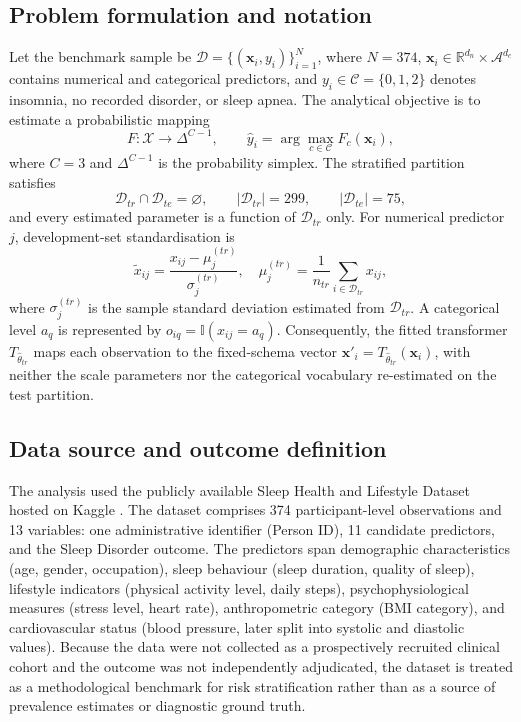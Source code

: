 \documentclass{elektr}
\begin{document}
\subsection{Problem formulation and notation}
Let the benchmark sample be $\mathcal{D}=\{(\mathbf{x}_i,y_i)\}_{i=1}^{N}$, where $N=374$, $\mathbf{x}_i\in\mathbb{R}^{d_n}\times\mathcal{A}^{d_c}$ contains numerical and categorical predictors, and $y_i\in\mathcal{C}=\{0,1,2\}$ denotes insomnia, no recorded disorder, or sleep apnea. The analytical objective is to estimate a probabilistic mapping
\begin{equation}
F:\mathcal{X}\rightarrow\Delta^{C-1},\qquad
\hat y_i=\arg\max_{c\in\mathcal{C}}F_c(\mathbf{x}_i),
\label{eq:problem}
\end{equation}
where $C=3$ and $\Delta^{C-1}$ is the probability simplex. The stratified partition satisfies
\begin{equation}
\mathcal{D}_{tr}\cap\mathcal{D}_{te}=\varnothing,
\qquad |\mathcal{D}_{tr}|=299,
\qquad |\mathcal{D}_{te}|=75,
\label{eq:partition}
\end{equation}
and every estimated parameter is a function of $\mathcal{D}_{tr}$ only. For numerical predictor $j$, development-set standardisation is
\begin{equation}
\widetilde{x}_{ij}=\frac{x_{ij}-\mu^{(tr)}_j}{\sigma^{(tr)}_j},
\quad
\mu^{(tr)}_j=\frac{1}{n_{tr}}\sum_{i\in\mathcal{D}_{tr}}x_{ij},
\label{eq:standardise}
\end{equation}
where $\sigma^{(tr)}_j$ is the sample standard deviation estimated from $\mathcal{D}_{tr}$. A categorical level $a_q$ is represented by $o_{iq}=\mathbb{I}(x_{ij}=a_q)$. Consequently, the fitted transformer $T_{\widehat{\theta}_{tr}}$ maps each observation to the fixed-schema vector $\mathbf{x}'_i=T_{\widehat{\theta}_{tr}}(\mathbf{x}_i)$, with neither the scale parameters nor the categorical vocabulary re-estimated on the test partition.

\subsection{Data source and outcome definition}
The analysis used the publicly available Sleep Health and Lifestyle Dataset hosted on Kaggle \cite{kaggle2023}. The dataset comprises 374 participant-level observations and 13 variables: one administrative identifier (Person ID), 11 candidate predictors, and the Sleep Disorder outcome. The predictors span demographic characteristics (age, gender, occupation), sleep behaviour (sleep duration, quality of sleep), lifestyle indicators (physical activity level, daily steps), psychophysiological measures (stress level, heart rate), anthropometric category (BMI category), and cardiovascular status (blood pressure, later split into systolic and diastolic values). Because the data were not collected as a prospectively recruited clinical cohort and the outcome was not independently adjudicated, the dataset is treated as a methodological benchmark for risk stratification rather than as a source of prevalence estimates or diagnostic ground truth.
\end{document}
